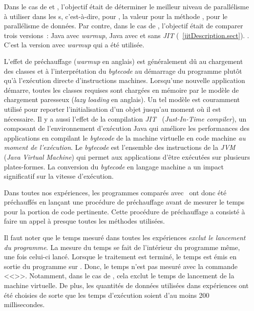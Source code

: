 Dans le cas de  et , l'objectif \'etait de d\'eterminer le meilleur niveau de parall\'elisme \`a utiliser dans les s, c'est-\`a-dire, pour , la valeur pour la m\'ethode , pour le parall\'elisme de donn\'ees.
%
Par contre, dans le cas de , l'objectif était de comparer trois versions~: Java avec \emph{warmup}, Java avec et sans \emph{JIT} (~\ref{jitDescription.sect}).
%
. 
%
C'est la version avec \emph{warmup} qui a \'et\'e utilis\'ee.




L'effet de pr\'echauffage (\emph{warmup} en anglais) est g\'en\'eralement d\^u au chargement des classes et \`a l'interpr\'etation du \emph{bytecode} au d\'emarrage du programme plutôt qu'à l'exécution directe d'instructions machines. Lorsqu'une nouvelle application d\'emarre, toutes les classes requises sont charg\'ees en m\'emoire par le mod\`ele de chargement paresseux (\emph{lazy loading} en anglais). Un tel mod\`ele est couramment utilis\'e pour reporter l'initialisation d'un objet jusqu'au moment o\`u il est n\'ecessaire.
%
\label{jitDescription.sect}
%
Il y a aussi l'effet de la compilation 
\emph{JIT}~\citep{cramer1997compiling} (\emph{Just-In-Time compiler}),
%
un composant de l'environnement d'ex\'ecution Java qui am\'eliore les performances des applications en compilant le \emph{bytecode} de la machine virtuelle en code machine \emph{au moment de l'ex\'ecution}. Le \emph{bytecode} est l'ensemble des instructions de la \emph{JVM} (\emph{Java Virtual Machine}) qui permet aux applications d'\^etre ex\'ecut\'ees sur plusieurs plates-formes. La conversion du \emph{bytecode} en langage machine a un impact significatif sur la vitesse d'ex\'ecution.

Dans toutes nos exp\'eriences, les programmes  comparés avec \ppff\ ont donc \'et\'e pr\'echauff\'es en lan\c{c}ant une proc\'edure de pr\'echauffage avant de mesurer le temps pour la portion de code pertinente. Cette proc\'edure de pr\'echauffage a consisté à faire un appel à presque toutes les m\'ethodes utilis\'ees.
 
Il faut noter que le temps mesur\'e dans toutes les exp\'eriences \emph{exclut le lancement du programme}. La mesure du temps se fait de l'int\'erieur du programme m\^eme, une fois celui-ci lanc\'e. Lorsque le traitement est termin\'e, le temps est \'emis en sortie du programme sur . Donc, le temps n'est pas mesur\'e avec la commande <<>>. Notamment, dans le cas de , cela exclut le temps de lancement de la machine virtuelle. De plus, les quantit\'es de donn\'ees utilis\'ees dans exp\'eriences ont \'et\'e choisies de sorte que les temps d'ex\'ecution soient d'au moins 200 millisecondes.


